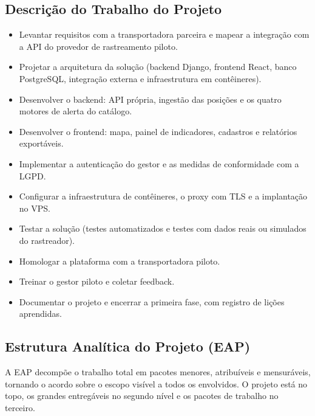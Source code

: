 \documentclass[11pt,a4paper]{article}
\begin{document}
\subsection{Descrição do Trabalho do Projeto}
\begin{itemize}[itemsep=2pt]
  \item Levantar requisitos com a transportadora parceira e mapear a integração com a API do provedor de rastreamento piloto.
  \item Projetar a arquitetura da solução (backend Django, frontend React, banco PostgreSQL, integração externa e infraestrutura em contêineres).
  \item Desenvolver o backend: API própria, ingestão das posições e os quatro motores de alerta do catálogo.
  \item Desenvolver o frontend: mapa, painel de indicadores, cadastros e relatórios exportáveis.
  \item Implementar a autenticação do gestor e as medidas de conformidade com a LGPD.
  \item Configurar a infraestrutura de contêineres, o proxy com TLS e a implantação no VPS.
  \item Testar a solução (testes automatizados e testes com dados reais ou simulados do rastreador).
  \item Homologar a plataforma com a transportadora piloto.
  \item Treinar o gestor piloto e coletar feedback.
  \item Documentar o projeto e encerrar a primeira fase, com registro de lições aprendidas.
\end{itemize}

\subsection{Estrutura Analítica do Projeto (EAP)}\label{esc:eap}
A EAP decompõe o trabalho total em pacotes menores, atribuíveis e mensuráveis, tornando o acordo sobre o escopo visível a todos os envolvidos. O projeto está no topo, os grandes entregáveis no segundo nível e os pacotes de trabalho no terceiro.
\end{document}
